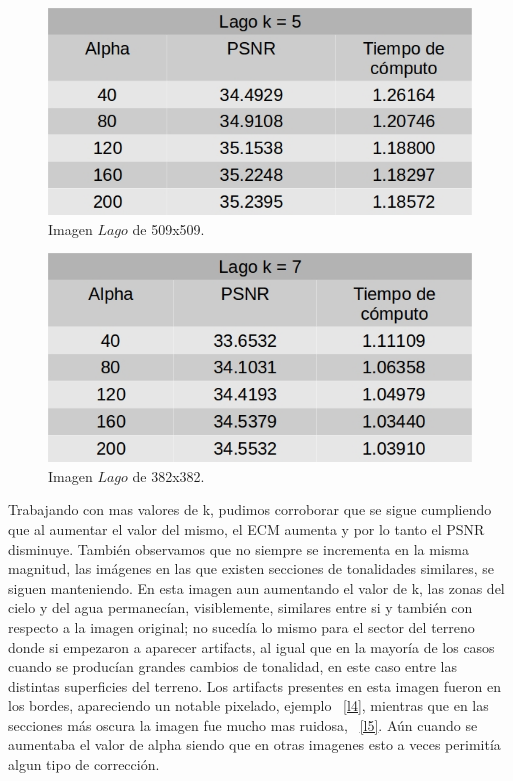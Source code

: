 \documentclass[a4paper]{article}
\begin{document}
    
        \begin{figure}[H]
    \centering
    \includegraphics[scale=0.4]{imagenes/lago5.jpg}
    \caption{Imagen $Lago$ de 509x509.}
	\label{lagoe}
    \end{figure}
    
    
        \begin{figure}[H]
    \centering
    \includegraphics[scale=0.4]{imagenes/lago7.jpg}
    \caption{Imagen $Lago$ de 382x382.}
	\label{lagoe}
    \end{figure}
    
    
Trabajando con mas valores de k, pudimos corroborar que se sigue cumpliendo que al aumentar el valor del mismo, el ECM aumenta y por lo tanto el PSNR disminuye. También observamos que no siempre se incrementa en la misma magnitud, las imágenes en las que existen secciones de tonalidades similares, se siguen manteniendo. En esta imagen aun aumentando el valor de k, las zonas del cielo y del agua permanecían, visiblemente, similares entre si y también con respecto a la imagen original; no sucedía lo mismo para el sector del terreno donde si empezaron a aparecer artifacts, al igual que en la mayoría de los casos cuando se producían grandes cambios de tonalidad, en este caso entre las distintas superficies del terreno. Los artifacts presentes en esta imagen fueron en los bordes, apareciendo un notable pixelado, ejemplo ~\ref{l4}, mientras que en las secciones m\'as oscura la imagen fue mucho mas ruidosa, ~\ref{l5}. Aún cuando se aumentaba el valor de alpha siendo que en otras imagenes esto a veces perimit\'ia algun tipo de corrección.   
    
\end{document}
